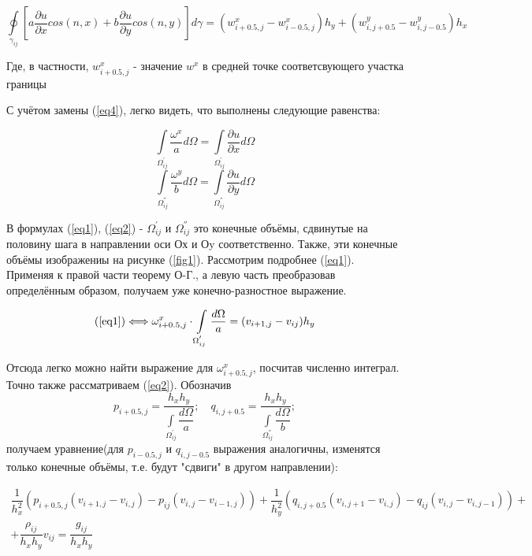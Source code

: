 \documentclass[12pt]{article}
\begin{document}
\begin{equation}\label{eq3}
\oint\limits_{\gamma_{ij}}{\left[ a\dfrac{\partial u}{\partial x}cos(n,x) + b\dfrac{\partial u}{\partial y}cos(n,y) \right]d\gamma} 
 = \left( w_{i+0.5,j}^x - w_{i-0.5,j}^x \right) h_y + 
\left( w_{i,j+0.5}^y - w_{i,j-0.5}^y \right) h_x 
\end{equation}

Где, в частности, $w_{i+0.5,j}^x$ - значение $w^x$ в средней точке соответсвующего участка границы

С учётом замены (\ref{eq4}), легко видеть, что выполнены следующие равенства:

\begin{equation}\label{eq1}
\int\limits_{\Omega_{ij}^{'}}{\dfrac{\omega^x}{a}d\Omega} = \int\limits_{\Omega_{ij}^{'}}{\dfrac{\partial u}{\partial x}d\Omega} 
\end{equation}
\begin{equation}\label{eq2}
\int\limits_{\Omega_{ij}^{''}}{\dfrac{\omega^y}{b}d\Omega} = \int\limits_{\Omega_{ij}^{''}}{\dfrac{\partial u}{\partial y}d\Omega}
\end{equation}

В формулах (\ref{eq1}), (\ref{eq2}) - $\Omega_{ij}^{'}$ и $\Omega_{ij}^{''}$ это конечные объёмы, сдвинутые на половину шага в направлении оси Ох и Оy соответственно. Также, эти конечные объёмы изображениы на рисунке (\ref{fig1}).
Рассмотрим подробнее (\ref{eq1}). Применяя к правой части теорему О-Г., а левую часть преобразовав определённым образом, получаем уже конечно-разностное выражение.

$$
(\ref{eq1}) \Longleftrightarrow \omega_{i+0.5,j}^x \cdot \int\limits_{\Omega_{ij}^{'}}{\dfrac{d\Omega}{a}} = (v_{i+1,j} - v_{ij})h_y
$$

Отсюда легко можно найти выражение для $\omega_{i+0.5,j}^x$, посчитав численно интеграл. Точно также рассматриваем (\ref{eq2}). Обозначив 
$$
p_{i+0.5, j} = \dfrac{h_xh_y}{\int\limits_{\Omega_{ij}^{'}}{\dfrac{d\Omega}{a}}} ; \quad
q_{i, j+0.5} = \dfrac{h_xh_y}{\int\limits_{\Omega_{ij}^{''}}{\dfrac{d\Omega}{b}}}; 
$$ 
получаем уравнение(для $p_{i-0.5, j}$ и $q_{i, j-0.5}$ выражения аналогичны, изменятся только конечные объёмы, т.е. будут "сдвиги" в другом направлении):

\begin{eqnarray}
\dfrac{1}{h_x^2}(p_{i+0.5,j}(v_{i+1,j}-v_{i,j}) - p_{ij}(v_{i,j}-v_{i-1,j})) +
\dfrac{1}{h_y^2}(q_{i,j+0.5}(v_{i,j+1}-v_{i,j}) - q_{ij}(v_{i,j}-v_{i,j-1})) + \nonumber
\\
+ \dfrac{\rho_{ij}}{h_xh_y}v_{ij}= \dfrac{g_{ij}}{h_xh_y}
\end{eqnarray}
\end{document}
